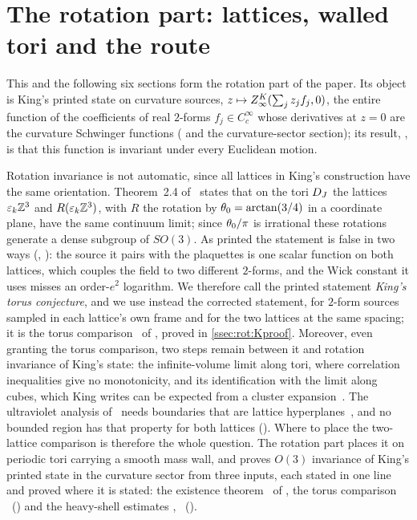 \section{The rotation part: lattices, walled tori and the route}\label{sec:rot}

This and the following six sections form the rotation part of the paper. Its object is King's printed state on curvature sources, $z\mapsto Z^{K}_{\infty}(\sum_jz_jf_j,0)$, the entire function of the coefficients of real $2$-forms $f_j\in C^\infty_c$ whose derivatives at $z=0$ are the curvature Schwinger functions ( and the curvature-sector section); its result, , is that this function is invariant under every Euclidean motion.

Rotation invariance is not automatic, since all lattices in King's construction have the same orientation. Theorem~2.4 of~\cite{K2} states that on the tori $D_J$ the lattices $\varepsilon_k\mathbb Z^3$ and $R(\varepsilon_k\mathbb Z^3)$, with $R$ the rotation by $\theta_0=\arctan(3/4)$ in a coordinate plane, have the same continuum limit; since $\theta_0/\pi$ is irrational these rotations generate a dense subgroup of $SO(3)$. As printed the statement is false in two ways (, ): the source it pairs with the plaquettes is one scalar function on both lattices, which couples the field to two different $2$-forms, and the Wick constant it uses misses an order-$e^2$ logarithm. We therefore call the printed statement \emph{King's torus conjecture}, and we use instead the corrected statement, for $2$-form sources sampled in each lattice's own frame and for the two lattices at the same spacing; it is the torus comparison \Kz\ of , proved in \cref{ssec:rot:Kproof}. Moreover, even granting the torus comparison, two steps remain between it and rotation invariance of King's state: the infinite-volume limit along tori, where correlation inequalities give no monotonicity, and its identification with the limit along cubes, which King writes can be expected from a cluster expansion~\cite[(2.24)]{K2}. The ultraviolet analysis of~\cite{K1,K2} needs boundaries that are lattice hyperplanes~\cite[p.~326]{K2}, and no bounded region has that property for both lattices (). Where to place the two-lattice comparison is therefore the whole question. The rotation part places it on periodic tori carrying a smooth mass wall, and proves $O(3)$ invariance of King's printed state in the curvature sector from three inputs, each stated in one line and proved where it is stated: the existence theorem \EC\ of , the torus comparison \Kz\ () and the heavy-shell estimates \HS, \DSh\ ().

